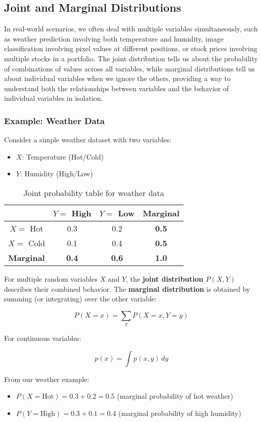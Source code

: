 \subsection{Joint and Marginal Distributions}

In real-world scenarios, we often deal with multiple variables simultaneously, such as weather prediction involving both temperature and humidity, image classification involving pixel values at different positions, or stock prices involving multiple stocks in a portfolio. The joint distribution tells us about the probability of combinations of values across all variables, while marginal distributions tell us about individual variables when we ignore the others, providing a way to understand both the relationships between variables and the behavior of individual variables in isolation.

\subsubsection{Example: Weather Data}

Consider a simple weather dataset with two variables:
\begin{itemize}
    \item $X$: Temperature (Hot/Cold)
    \item $Y$: Humidity (High/Low)
\end{itemize}

\begin{table}[h]
\centering
\begin{tabular}{|c|c|c|c|}
\hline
 & $Y=$ High & $Y=$ Low & \textbf{Marginal} \\
\hline
$X=$ Hot & 0.3 & 0.2 & \textbf{0.5} \\
$X=$ Cold & 0.1 & 0.4 & \textbf{0.5} \\
\hline
\textbf{Marginal} & \textbf{0.4} & \textbf{0.6} & \textbf{1.0} \\
\hline
\end{tabular}
\caption{Joint probability table for weather data}
\label{tab:weather-joint}
\end{table}

For multiple random variables $X$ and $Y$, the \textbf{joint distribution} $P(X, Y)$ describes their combined behavior. The \textbf{marginal distribution} is obtained by summing (or integrating) over the other variable:

\begin{equation}
P(X=x) = \sum_{y} P(X=x, Y=y)
\end{equation}

For continuous variables:

\begin{equation}
p(x) = \int p(x, y) \, dy
\end{equation}

From our weather example:
\begin{itemize}
    \item $P(X=\text{Hot}) = 0.3 + 0.2 = 0.5$ (marginal probability of hot weather)
    \item $P(Y=\text{High}) = 0.3 + 0.1 = 0.4$ (marginal probability of high humidity)
\end{itemize}
